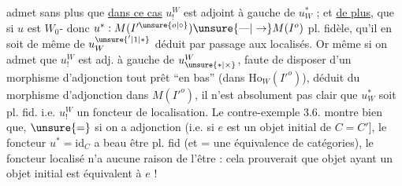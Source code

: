 admet sans plus que \uline{dans ce cas} $u_!^W$ est
adjoint à gauche de $u_W^*$ ; et \uline{de plus},
que si $u$ est $W_0$- donc
$u^*:M(I'^{\unsure{o|\circ}})\unsure{\text{---}|\to}M(I^o)$ pl. fidèle, qu'il en
soit de même de $u_W^{\unsure{'|1|*}}$ déduit par passage
aux localisés. Or même si on admet
que $u_!^W$ est adj. à gauche de $u_{\unsure{*|\times}}^W$,
faute de disposer d'un morphisme
d'adjonction tout prêt ``en bas'' (dans
$\mathrm{Ho}_W(I'^o)$), déduit du morphisme
d'adjonction dans $M(I'^o)$, il n'est
absolument pas clair que 
$u_W^*$ soit pl. fid. i.e. $u_!^W$ un foncteur
de localisation. Le contre-exemple 3.6.
montre bien que, $\unsure{=}$ si on a adjonction
(i.e. si $e$ est un objet initial de $C=C'$],
le foncteur $u^*=\mathrm{id}_C$ a beau être pl.
fid (et $\mathord{=}$ une équivalence de catégories),
le foncteur localisé n'a aucune raison
de l'être : cela prouverait que  objet
 ayant un objet initial est
 équivalent à $e$ !
